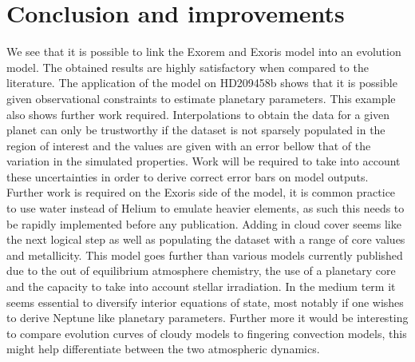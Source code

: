 \section{Conclusion and improvements}
We see that it is possible to link the Exorem and Exoris model into an evolution model. The obtained results are highly satisfactory when compared to the literature. The application of the model on HD209458b shows that it is possible given observational constraints to estimate planetary parameters. This example also shows further work required. Interpolations to obtain the data for a given planet can only be trustworthy if the dataset is not sparsely populated in the region of interest and the values are given with an error bellow that of the variation in the simulated properties. Work will be required to take into account these uncertainties in order to derive correct error bars on model outputs. Further work is required on the Exoris side of the model, it is common practice to use water instead of Helium to emulate heavier elements, as such this needs to be rapidly implemented before any publication. Adding in cloud cover seems like the next logical step as well as populating the dataset with a range of core values and metallicity. This model goes further than various models currently published due to the out of equilibrium atmosphere chemistry, the use of a planetary core and the capacity to take into account stellar irradiation. In the medium term it seems essential to diversify interior equations of state, most notably if one wishes to derive Neptune like planetary parameters. Further more it would be interesting to compare evolution curves of cloudy models to fingering convection models, this might help differentiate between the two atmospheric dynamics.